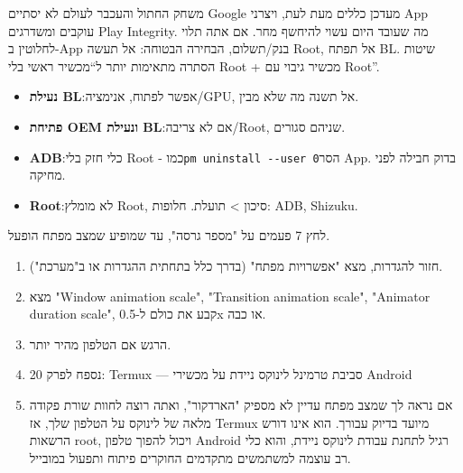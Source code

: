 \begin{tcbwarn}{משחק החתול והעכבר לעולם לא יסתיים}
Google מעדכן כללים מעת לעת, ויצרני App עוקבים ומשדרגים Play Integrity. מה שעובד היום עשוי להיחשף מחר. אם אתה תלוי לחלוטין ב-App בנק/תשלום, הבחירה הבטוחה: אל תעשה Root, אל תפתח BL. שיטות הסתרה מתאימות יותר ל“מכשיר ראשי בלי Root + מכשיר גיבוי עם Root”.

\end{tcbwarn}


\begin{itemize}
  \item \textbf{נעילת BL}:אפשר לפתוח, אנימציה/GPU, אל תשנה מה שלא מבין.
  \item \textbf{פתיחת OEM ונעילת BL}:אם לא צריבה/Root, שניהם סגורים.
  \item \textbf{ADB}:כלי חזק בלי Root - כמו\texttt{pm uninstall -\allowbreak -\allowbreak user 0}הסר App. בדוק חבילה לפני מחיקה.
  \item \textbf{Root}:לא מומלץ Root, סיכון > תועלת. חלופות: ADB, Shizuku.
\end{itemize}

\begin{tcbpractice}{לחץ 7 פעמים על "מספר גרסה", עד שמופיע שמצב מפתח הופעל.}
\begin{enumerate}
  \item חזור להגדרות, מצא "אפשרויות מפתח" (בדרך כלל בתחתית ההגדרות או ב"מערכת").
  \item מצא "Window animation scale", "Transition animation scale", "Animator duration scale", קבע את כולם ל-0.5x או כבה.
  \item הרגש אם הטלפון מהיר יותר.
  \item נספח לפרק 20: Termux — סביבת טרמינל לינוקס ניידת על מכשירי Android
  \item אם נראה לך שמצב מפתח עדיין לא מספיק "הארדקור", ואתה רוצה לחוות שורת פקודה מלאה של לינוקס על הטלפון שלך, אז Termux מיועד בדיוק עבורך. הוא אינו דורש הרשאות root, ויכול להפוך טלפון Android רגיל לתחנת עבודת לינוקס ניידת, והוא כלי רב עוצמה למשתמשים מתקדמים החוקרים פיתוח ותפעול במובייל.
\end{enumerate}

\end{tcbpractice}
